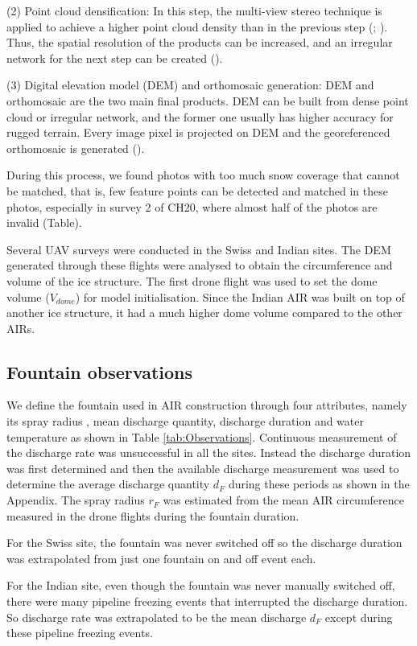 \documentclass[utf8]{frontiersSCNS} %
\begin{document}
(2) Point cloud densification: In this step, the multi-view stereo technique is applied to achieve a higher point cloud
density than in the previous step (\cite{Furukawa_2010}; \cite{Molg_2017}). Thus, the spatial resolution of the
products can be increased, and an irregular network for the next step can be created (\cite{Kung_2011}).

(3) Digital elevation model (DEM) and orthomosaic generation: DEM and orthomosaic are the two main final products. DEM
can be built from dense point cloud or irregular network, and the former one usually has higher accuracy for rugged
terrain. Every image pixel is projected on DEM and the georeferenced orthomosaic is generated (\cite{Kung_2011}).

During this process, we found photos with too much snow coverage that cannot be matched, that is, few feature points can
be detected and matched in these photos, especially in survey 2 of CH20, where almost half of the photos are invalid
(Table).

Several UAV surveys were conducted in the Swiss and Indian sites. The DEM generated through these flights were
analysed to obtain the circumference and volume of the ice structure. The first drone flight was used to set the dome
volume ($V_{dome}$) for model initialisation. Since the Indian AIR was built on top of another ice structure, it had
a much higher dome volume compared to the other AIRs.

\subsection{Fountain observations}
We define the fountain used in AIR construction through four attributes, namely its spray radius , mean discharge
quantity, discharge duration and water temperature as shown in Table \ref{tab:Observations}. Continuous measurement of
the discharge rate was unsuccessful in all the sites. Instead the discharge duration was first determined and then the
available discharge measurement was used to determine the average discharge quantity $d_F$ during these periods as shown
in the Appendix. The spray radius $r_F$ was estimated from the mean AIR circumference measured in the drone flights
during the fountain duration.

For the Swiss site, the fountain was never switched off so the discharge duration was extrapolated from just one fountain
on and off event each.

For the Indian site, even though the fountain was never manually switched off, there were many pipeline freezing events that
interrupted the discharge duration. So discharge rate was extrapolated to be the mean discharge $d_F$ except during
these pipeline freezing events.
\end{document}
